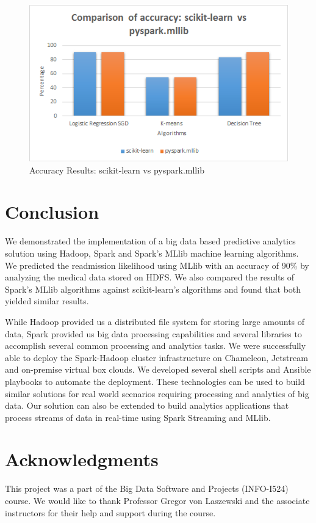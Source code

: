 \documentclass[9pt,twocolumn,twoside]{styles/osajnl}
\begin{document}
\begin{figure}[h]
\centering
\includegraphics[width=\linewidth]{images/mllibvssklearn.png}
\caption{Accuracy Results: scikit-learn vs pyspark.mllib}
\label{fig:mllibvssklearn}
\end{figure}

\section{Conclusion}
We demonstrated the implementation of a big data based  predictive analytics solution using Hadoop, Spark and Spark’s MLlib machine learning algorithms. We predicted the readmission likelihood using MLlib with an accuracy of 90$\%$ by analyzing the medical data stored on HDFS. We also compared the results of Spark's MLlib \cite{www-mllib} algorithms against scikit-learn's algorithms and found that both yielded similar results.	 

While Hadoop provided us a distributed file system for storing large amounts of data, Spark provided us big data processing capabilities and several libraries to accomplish several common processing and analytics tasks. We were successfully able to deploy the Spark-Hadoop cluster infrastructure on Chameleon, Jetstream and on-premise virtual box clouds. We developed several shell scripts and Ansible playbooks to automate the deployment. These technologies can be used to build similar solutions for real world scenarios requiring processing and analytics of big data.  Our solution can also be extended to build analytics applications that process streams of data in real-time using Spark Streaming \cite{www-sparkstreaming} and MLlib. 

\section{Acknowledgments}
This project was a part of the Big Data Software and Projects (INFO-I524) course. We would like to thank Professor Gregor von Laszewski and the associate instructors for their help and support during the course. 
\end{document}

